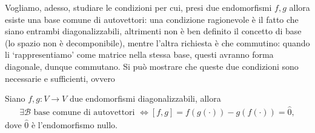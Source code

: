 Vogliamo, adesso, studiare le condizioni per cui, presi due endomorfismi $f, g$ allora esiste una base comune di autovettori: una condizione ragionevole è il fatto che siano entrambi diagonalizzabili, altrimenti non è ben definito il concetto di base (lo spazio non è decomponibile), mentre l'altra richiesta è che commutino: quando li `rappresentiamo' come matrice nella stessa base, questi
avranno forma diagonale, dunque commutano. Si può mostrare che queste due condizioni sono necessarie e sufficienti, ovvero
\begin{theorem}
    Siano $f, g: V \to V$ due endomorfismi diagonalizzabili, allora
    \begin{align}
        \exists \mathcal{B} \text{ base comune di autovettori } \iff [f, g] = f(g(\cdot)) - g(f(\cdot)) = \hat{0},
    \end{align}
    dove $\hat{0}$ è l'endomorfismo nullo.
\end{theorem}
